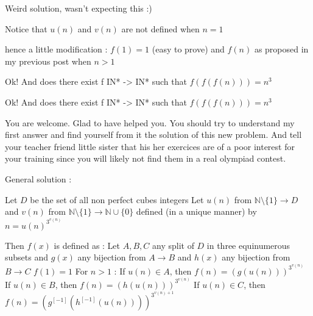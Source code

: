 \begin{solution}
	Weird solution, wasn't expecting this :)
\end{solution}



\begin{solution}
	Notice that $u(n)$ and $v(n)$ are not defined when $n=1$

hence a little modification :
$f(1)=1$ (easy to prove)
and $f(n)$ as proposed in my previous post when $n>1$
\end{solution}



\begin{solution}
	Ok!
And does there exist f IN* -> IN* such that $f(f(f(n)))=n^{3}$
\end{solution}



\begin{solution}
	\begin{tcolorbox}Ok!
And does there exist f IN* -> IN* such that $f(f(f(n)))=n^{3}$\end{tcolorbox}
You are welcome. Glad to have helped you.
You should try to understand my first answer and find yourself from it the solution of this new problem.
And tell your teacher \/ friend \/ little sister that his \/ her exercices are of a poor interest for your training since you will likely not find them in a real olympiad contest.

General solution :

Let $D$ be the set of all non perfect cubes integers
Let $u(n)$ from $\mathbb N\setminus\{1\}\to D$ and $v(n)$ from $\mathbb N\setminus\{1\}\to \mathbb N\cup\{0\}$ defined (in a unique manner) by $n=u(n)^{3^{v(n)}}$

Then $f(x)$ is defined as :
Let $A,B,C$ any split of $D$ in three equinumerous subsets and $g(x)$ any bijection from $A\to B$ and $h(x)$ any bijection from $B\to C$
$f(1)=1$
For $n>1$ :
If $u(n)\in A$, then $f(n)=\left(g(u(n))\right)^{3^{v(n)}}$
If $u(n)\in B$, then $f(n)=\left(h(u(n))\right)^{3^{v(n)}}$
If $u(n)\in C$, then $f(n)=\left(g^{[-1]}(h^{[-1]}(u(n)))\right)^{3^{v(n)+1}}$
\end{solution}



